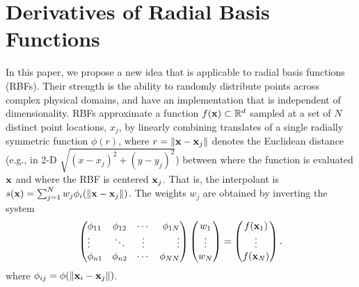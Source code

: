 \documentclass[10pt,conference,compsocconf]{IEEEtran}
\begin{document}
\section{Derivatives of Radial Basis Functions}
\label{sec:rbf}


In this paper, we propose a new idea that is applicable to radial
basis functions (RBFs). Their strength is the ability to randomly
distribute points across complex physical domains, and have an
implementation that is independent of dimensionality. RBFs approximate
a function $f({\bf x})\subset \mathbb{R}^d$ sampled at a set of $N$
distinct point locations, $x_j$, by linearly combining translates of a
single radially symmetric function $\phi(r)$, where $r =
\|{\bf x}-{\bf x}_{j}\|$ denotes the Euclidean distance (e.g., in 2-D
$\sqrt{(x-x_j)^2+(y-y_j)^2}$) between where the function is evaluated
${\bf x}$ and where the RBF is centered ${\bf x}_{j}$. That is, the
interpolant is $s({\bf x}) = \sum_{j=1}^{N} w_j
\phi_i(\|{\bf x}-{\bf x}_{j}\|)$. The weights $w_j$ are obtained by
inverting the system
\begin{equation}
\parray{lccr}{
\phi_{11} & \phi_{12} & \cdots & \phi_{1N} \\
\vdots & \ddots & \vdots & \vdots \\
\phi_{n1} & \phi_{n2} & \cdots & \phi_{NN} 
}
\parray{c}{ w_{1} \\ \vdots \\ w_{N} }
=
\parray{c}{ f(\xvec_1) \\ \vdots\\ f(\xvec_N) }. 
\label{eq:rbf}
\end{equation}
where $\phi_{ij} = \phi(\|{\bf x}_i-{\bf x}_j\|)$. 
\end{document}
